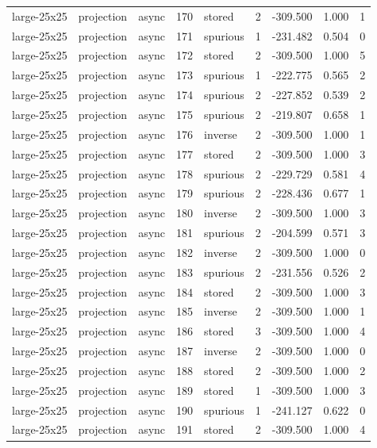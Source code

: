 \begin{tabular}{lllrlrrrr}
large-25x25 & projection & async & 170 & stored & 2 & -309.500 & 1.000 & 1 \\
large-25x25 & projection & async & 171 & spurious & 1 & -231.482 & 0.504 & 0 \\
large-25x25 & projection & async & 172 & stored & 2 & -309.500 & 1.000 & 5 \\
large-25x25 & projection & async & 173 & spurious & 1 & -222.775 & 0.565 & 2 \\
large-25x25 & projection & async & 174 & spurious & 2 & -227.852 & 0.539 & 2 \\
large-25x25 & projection & async & 175 & spurious & 2 & -219.807 & 0.658 & 1 \\
large-25x25 & projection & async & 176 & inverse & 2 & -309.500 & 1.000 & 1 \\
large-25x25 & projection & async & 177 & stored & 2 & -309.500 & 1.000 & 3 \\
large-25x25 & projection & async & 178 & spurious & 2 & -229.729 & 0.581 & 4 \\
large-25x25 & projection & async & 179 & spurious & 2 & -228.436 & 0.677 & 1 \\
large-25x25 & projection & async & 180 & inverse & 2 & -309.500 & 1.000 & 3 \\
large-25x25 & projection & async & 181 & spurious & 2 & -204.599 & 0.571 & 3 \\
large-25x25 & projection & async & 182 & inverse & 2 & -309.500 & 1.000 & 0 \\
large-25x25 & projection & async & 183 & spurious & 2 & -231.556 & 0.526 & 2 \\
large-25x25 & projection & async & 184 & stored & 2 & -309.500 & 1.000 & 3 \\
large-25x25 & projection & async & 185 & inverse & 2 & -309.500 & 1.000 & 1 \\
large-25x25 & projection & async & 186 & stored & 3 & -309.500 & 1.000 & 4 \\
large-25x25 & projection & async & 187 & inverse & 2 & -309.500 & 1.000 & 0 \\
large-25x25 & projection & async & 188 & stored & 2 & -309.500 & 1.000 & 2 \\
large-25x25 & projection & async & 189 & stored & 1 & -309.500 & 1.000 & 3 \\
large-25x25 & projection & async & 190 & spurious & 1 & -241.127 & 0.622 & 0 \\
large-25x25 & projection & async & 191 & stored & 2 & -309.500 & 1.000 & 4 \\

\end{tabular}
